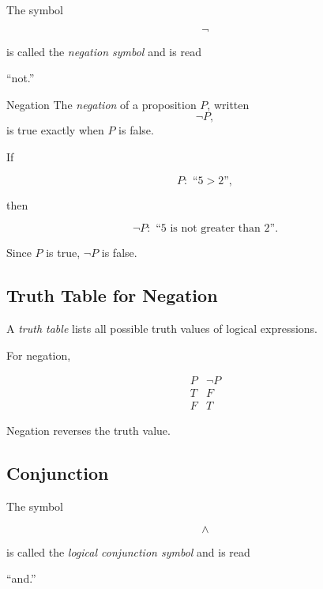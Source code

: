 The symbol

\[ \neg \]

is called the \emph{negation symbol} and is read

\begin{center}
``not.''
\end{center}

\begin{definitionbox}{Negation}
The \emph{negation} of a proposition \(P\), written
\[ \neg P, \]
is true exactly when \(P\) is false.
\end{definitionbox}

If

\[ P:\text{ ``\(5>2\)''}, \]

then

\[ \neg P:\text{ ``\(5\) is not greater than \(2\)''}. \]

Since \(P\) is true, \(\neg P\) is false.

\subsection{Truth Table for Negation}
\label{subsec:negation-truth-table}

A \emph{truth table} lists all possible truth values of logical expressions.

For negation,

\[
\begin{array}{c|c}
P & \neg P\\ \hline
T & F\\
F & T
\end{array}
\]

Negation reverses the truth value.

\subsection{Conjunction}
\label{subsec:conjunction}

The symbol

\[ \land \]

is called the \emph{logical conjunction symbol} and is read

\begin{center}
``and.''
\end{center}

